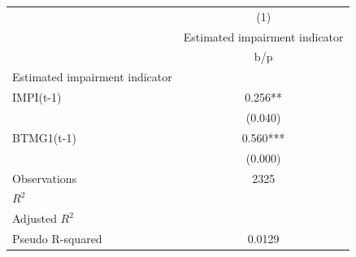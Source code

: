 {
\def\sym#1{\ifmmode^{#1}\else\(^{#1}\)\fi}
\begin{tabular}{l*{1}{c}}
\hline\hline
                    &\multicolumn{1}{c}{(1)}\\
                    &\multicolumn{1}{c}{Estimated impairment indicator}\\
                    &         b/p   \\
\hline
Estimated impairment indicator&               \\
IMPI(t-1)           &       0.256** \\
                    &     (0.040)   \\
BTMG1(t-1)          &       0.560***\\
                    &     (0.000)   \\
\hline
Observations        &        2325   \\
\(R^{2}\)           &               \\
Adjusted \(R^{2}\)  &               \\
Pseudo R-squared    &      0.0129   \\
\hline\hline
\end{tabular}
}
